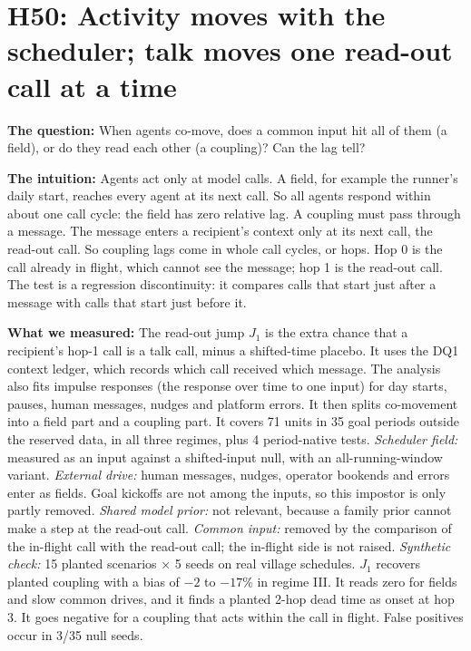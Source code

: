 \section{H50: Activity moves with the scheduler; talk moves one read-out call at a time}

\textbf{The question:}
When agents co-move, does a common input hit all of them (a field), or do they read each other (a coupling)? Can the lag tell?

\textbf{The intuition:}
Agents act only at model calls.
A field, for example the runner's daily start, reaches every agent at its next call.
So all agents respond within about one call cycle: the field has zero relative lag.
A coupling must pass through a message.
The message enters a recipient's context only at its next call, the read-out call.
So coupling lags come in whole call cycles, or hops.
Hop 0 is the call already in flight, which cannot see the message; hop 1 is the read-out call.
The test is a regression discontinuity: it compares calls that start just after a message with calls that start just before it.

\textbf{What we measured:}
The read-out jump $J_1$ is the extra chance that a recipient's hop-1 call is a talk call, minus a shifted-time placebo.
It uses the DQ1 context ledger, which records which call received which message.
The analysis also fits impulse responses (the response over time to one input) for day starts, pauses, human messages, nudges and platform errors.
It then splits co-movement into a field part and a coupling part.
It covers 71 units in 35 goal periods outside the reserved data, in all three regimes, plus 4 period-native tests.
\emph{Scheduler field:} measured as an input against a shifted-input null, with an all-running-window variant.
\emph{External drive:} human messages, nudges, operator bookends and errors enter as fields.
Goal kickoffs are not among the inputs, so this impostor is only partly removed.
\emph{Shared model prior:} not relevant, because a family prior cannot make a step at the read-out call.
\emph{Common input:} removed by the comparison of the in-flight call with the read-out call; the in-flight side is not raised.
\emph{Synthetic check:} 15 planted scenarios $\times$ 5 seeds on real village schedules.
$J_1$ recovers planted coupling with a bias of $-2$ to $-17\%$ in regime III.
It reads zero for fields and slow common drives, and it finds a planted 2-hop dead time as onset at hop 3.
It goes negative for a coupling that acts within the call in flight.
False positives occur in 3/35 null seeds.

